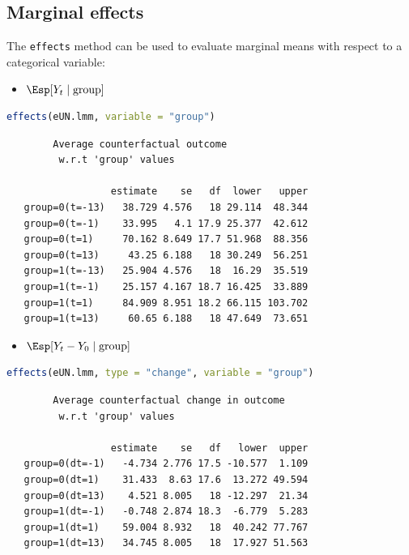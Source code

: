 \documentclass[12pt]{article}
\begin{document}
\clearpage
\subsection{Marginal effects}
\label{sec:org335a95d}

The \texttt{effects} method can be used to evaluate marginal means with
respect to a categorical variable:
\begin{itemize}
\item \(\Esp[Y_t \mid \text{group}]\)
\end{itemize}
\begin{lstlisting}[language=r,numbers=none]
effects(eUN.lmm, variable = "group")
\end{lstlisting}

\label{}
\begin{verbatim}
		Average counterfactual outcome
		 w.r.t 'group' values 

                  estimate    se   df  lower   upper
   group=0(t=-13)   38.729 4.576   18 29.114  48.344
   group=0(t=-1)    33.995   4.1 17.9 25.377  42.612
   group=0(t=1)     70.162 8.649 17.7 51.968  88.356
   group=0(t=13)     43.25 6.188   18 30.249  56.251
   group=1(t=-13)   25.904 4.576   18  16.29  35.519
   group=1(t=-1)    25.157 4.167 18.7 16.425  33.889
   group=1(t=1)     84.909 8.951 18.2 66.115 103.702
   group=1(t=13)     60.65 6.188   18 47.649  73.651
\end{verbatim}

\begin{itemize}
\item \(\Esp[Y_t-Y_0 \mid \text{group}]\)
\end{itemize}
\begin{lstlisting}[language=r,numbers=none]
effects(eUN.lmm, type = "change", variable = "group")
\end{lstlisting}

\label{}
\begin{verbatim}
		Average counterfactual change in outcome
		 w.r.t 'group' values 

                  estimate    se   df   lower  upper
   group=0(dt=-1)   -4.734 2.776 17.5 -10.577  1.109
   group=0(dt=1)    31.433  8.63 17.6  13.272 49.594
   group=0(dt=13)    4.521 8.005   18 -12.297  21.34
   group=1(dt=-1)   -0.748 2.874 18.3  -6.779  5.283
   group=1(dt=1)    59.004 8.932   18  40.242 77.767
   group=1(dt=13)   34.745 8.005   18  17.927 51.563
\end{verbatim}
\end{document}

